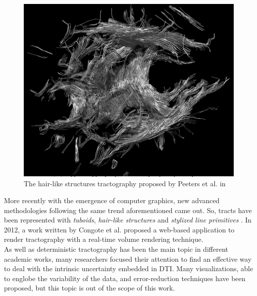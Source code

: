 \documentclass{article}
\begin{document}
\begin{multicols}{2}
\begin{figure}[H]
\centering
\includegraphics[width = 0.8\columnwidth]{hairLike}
\caption{The hair-like structures tractography proposed by Peeters et al. in \cite{peeters2006visualization}}
\label{fig:weightedGraph}
\end{figure}

More recently with the emergence of computer graphics, new advanced methodologies following the same trend aforementioned came out. So, tracts have been represented with \textit{tuboids}\cite{petrovic2007visualizing}, \textit{hair-like structures} \cite{peeters2006visualization} and \textit{stylized line primitives} \cite{stoll2005visualization}. In 2012, a work written by Congote et al. proposed a web-based application to render tractography \cite{congote2012real} with a real-time volume rendering technique. \\
As well as deterministic tractography has been the main topic in different academic works, many researchers focused their attention to find an effective way to deal with the intrinsic uncertainty embedded in DTI. Many visualizations, able to englobe the variability of the data, and error-reduction techniques have been proposed, but this topic is out of the scope of this work.



\end{multicols}
\end{document}

